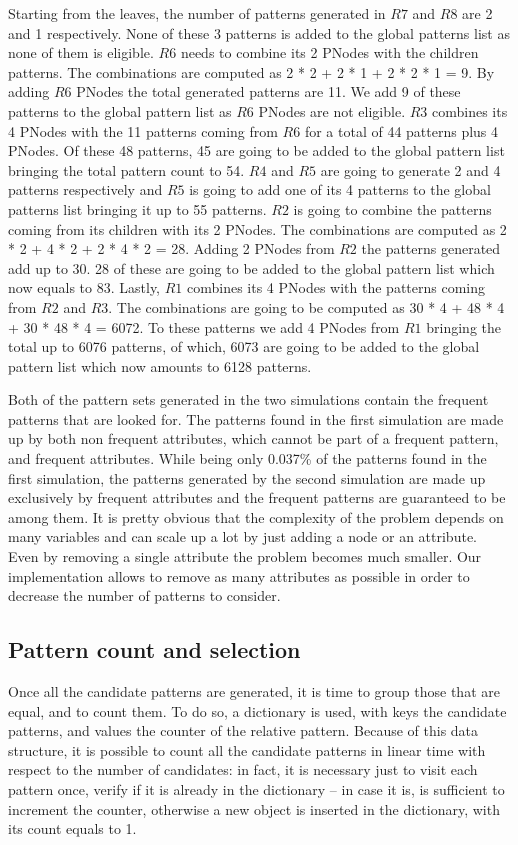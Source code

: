 \documentclass{acm_proc_article-sp-sigmod09}
\begin{document}
Starting from the leaves, the number of patterns generated in $R7$ and $R8$ are 2 and 1 respectively. None of these 3 patterns is added to the global patterns list as none of them is eligible. $R6$ needs to combine its 2 PNodes with the children patterns. The combinations are computed as 2 * 2 + 2 * 1 + 2 * 2 * 1 = 9. By adding $R6$ PNodes the total generated patterns are 11. We add 9 of these patterns to the global pattern list as $R6$ PNodes are not eligible. $R3$ combines its 4 PNodes with the 11 patterns coming from $R6$ for a total of 44 patterns plus 4 PNodes. Of these 48 patterns, 45 are going to be added to the global pattern list bringing the total pattern count to 54. $R4$ and $R5$ are going to generate 2 and 4 patterns respectively and $R5$ is going to add one of its 4 patterns to the global patterns list bringing it up to 55 patterns. $R2$ is going to combine the patterns coming from its children with its 2 PNodes. The combinations are computed as 2 * 2 + 4 * 2 + 2 * 4 * 2 = 28. Adding 2 PNodes from $R2$ the patterns generated add up to 30. 28 of these are going to be added to the global pattern list which now equals to 83. Lastly, $R1$ combines its 4 PNodes with the patterns coming from $R2$ and $R3$. The combinations are going to be computed as 30 * 4 + 48 * 4 + 30 * 48 * 4 = 6072. To these patterns we add 4 PNodes from $R1$ bringing the total up to 6076 patterns, of which, 6073 are going to be added to the global pattern list which now amounts to 6128 patterns.

Both of the pattern sets generated in the two simulations contain the frequent patterns that are looked for. The patterns found in the first simulation are made up by both non frequent attributes, which cannot be part of a frequent pattern, and frequent attributes. While being only 0.037\% of the patterns found in the first simulation, the patterns generated by the second simulation are made up exclusively by frequent attributes and the frequent patterns are guaranteed to be among them. It is pretty obvious that the complexity of the problem depends on many variables and can scale up a lot by just adding a node or an attribute. Even by removing a single attribute the problem becomes much smaller. Our implementation allows to remove as many attributes as possible in order to decrease the number of patterns to consider.

\subsection{Pattern count and selection}
Once all the candidate patterns are generated, it is time to group those that are equal, and to count them. To do so, a dictionary is used, with keys the candidate patterns, and values the counter of the relative pattern. Because of this data structure, it is possible to count all the candidate patterns in linear time with respect to the number of candidates: in fact, it is necessary just to visit each pattern once, verify if it is already in the dictionary -- in case it is, is sufficient to increment the counter, otherwise a new object is inserted in the dictionary, with its count equals to 1.
\end{document}
